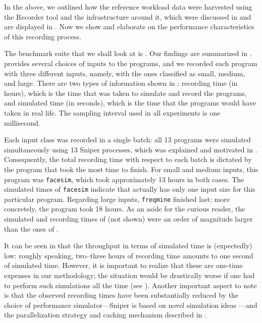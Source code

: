 
In the above, we outlined how the reference workload data were harvested using
the Recorder tool and the infrastructure around it, which were discussed in
 and are displayed in . Now we show and elaborate
on the performance characteristics of this recording process.

The benchmark suite that we shall look at is . Our findings are
summarized in .  provides several choices of inputs
to the programs, and we recorded each program with three different inputs,
namely, with the ones classified as small, medium, and large. There are two
types of information shown in : recording time (in hours), which
is the time that was taken to simulate and record the programs, and simulated
time (in seconds), which is the time that the programs would have taken in real
life. The sampling interval used in all experiments is one millisecond.

Each input class was recorded in a single batch: all 13 programs were simulated
simultaneously using 13 Sniper processes, which was explained and motivated in
. Consequently, the total recording time with respect to each
batch is dictated by the program that took the most time to finish. For small
and medium inputs, this program was \texttt{facesim}, which took approximately
13 hours in both cases. The simulated times of \texttt{facesim} indicate that
 actually has only one input size for this particular program.
Regarding large inputs, \texttt{freqmine} finished last; more concretely, the
program took 18 hours. As an aside for the curious reader, the simulated and
recording times of  (not shown) were an order of magnitude
larger than the ones of .

It can be seen in  that the throughput in terms of simulated
time is (expectedly) low: roughly speaking, two--three hours of recording time
amounts to one second of simulated time. However, it is important to realize
that these are one-time expenses in our methodology; the situation would be
drastically worse if one had to perform such simulations all the time (see
). Another important aspect to note is that the observed
recording times have been substantially reduced by the choice of performance
simulator---Sniper is based on novel simulation ideas \cite{carlson2011}---and
the parallelization strategy and caching mechanism described in .
